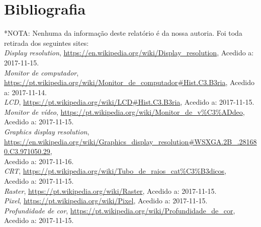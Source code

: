 \documentclass[a4paper]{report}
\begin{document}
\chapter*{Bibliografia}
*NOTA: Nenhuma da informação deste relatório é da nossa autoria. Foi toda retirada dos seguintes sites:\\

\textit{Display resolution}, 
\url{https://en.wikipedia.org/wiki/Display_resolution},
Acedido a: 2017-11-15.\\

\textit{Monitor de computador}, 
\url{https://pt.wikipedia.org/wiki/Monitor_de_computador#Hist.C3.B3ria},
Acedido a: 2017-11-14.\\

\textit{LCD}, 
\url{https://pt.wikipedia.org/wiki/LCD#Hist.C3.B3ria},
Acedido a: 2017-11-15.\\

\textit{Monitor de vídeo}, 
\url{https://pt.wikipedia.org/wiki/Monitor_de_v\%C3\%ADdeo},
Acedido a: 2017-11-15.\\

\textit{Graphics display resolution}, 
\url{https://en.wikipedia.org/wiki/Graphics_display_resolution#WSXGA.2B_.281680.C3.971050.29}, \\Acedido a: 2017-11-16.\\

\textit{CRT}, 
\url{https://pt.wikipedia.org/wiki/Tubo_de_raios_cat\%C3\%B3dicos}, \\Acedido a: 2017-11-15.\\

\textit{Raster}, 
\url{https://pt.wikipedia.org/wiki/Raster}, Acedido a: 2017-11-15.\\

\textit{Pixel}, 
\url{https://pt.wikipedia.org/wiki/Pixel}, Acedido a: 2017-11-15.\\

\textit{Profundidade de cor}, 
\url{https://pt.wikipedia.org/wiki/Profundidade_de_cor}, Acedido a: 2017-11-15.\\

\printbibliography
\end{document}
